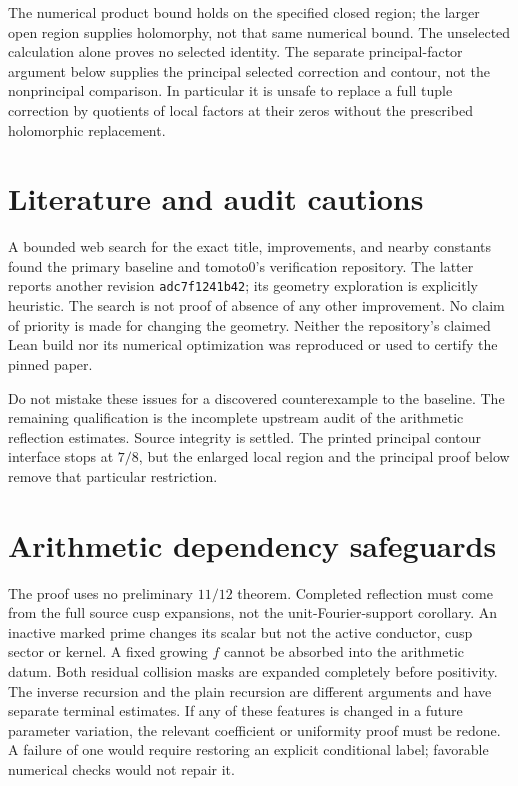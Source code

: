 \documentclass[12pt]{article}
\begin{document}
The numerical product bound holds on the specified closed region;
the larger open region supplies holomorphy, not that same numerical
bound.  The unselected calculation alone proves no selected identity.
The separate principal-factor argument below supplies the principal
selected correction and contour, not the nonprincipal comparison.  In particular it is unsafe to
replace a full tuple correction by quotients of local factors at
their zeros without the prescribed holomorphic replacement.

\section{Literature and audit cautions}
A bounded web search for the exact title, improvements, and nearby
constants found the primary baseline and tomoto0's verification
repository.  The latter reports another revision
\texttt{adc7f1241b42}; its geometry exploration is explicitly heuristic.
The search is not proof of absence of any other improvement.
No claim of priority is made for changing the geometry.
Neither the repository's claimed Lean build nor its numerical
optimization was reproduced or used to certify the pinned paper.

Do not mistake these issues for a discovered counterexample to the
baseline.  The remaining qualification is the incomplete upstream audit of the
arithmetic reflection estimates.  Source integrity is settled.  The printed
principal contour interface stops at \(7/8\), but the enlarged local
region and the principal proof below remove that particular restriction.


\section{Arithmetic dependency safeguards}
The proof uses no preliminary \(11/12\) theorem.
Completed reflection must come from the full source cusp expansions,
not the unit-Fourier-support corollary.
An inactive marked prime changes its scalar but not the active
conductor, cusp sector or kernel.  A fixed growing \(f\) cannot be
absorbed into the arithmetic datum.  Both residual collision masks
are expanded completely before positivity.
The inverse recursion and the plain recursion are different
arguments and have separate terminal estimates.
If any of these features is changed in a future parameter variation,
the relevant coefficient or uniformity proof must be redone.
A failure of one would require restoring an explicit conditional
label; favorable numerical checks would not repair it.
\end{document}
